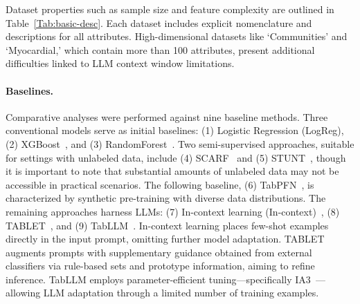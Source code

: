 Dataset properties such as sample size and feature complexity are outlined in Table~\ref{Tab:basic-desc}. Each dataset includes explicit nomenclature and descriptions for all attributes. High-dimensional datasets like `Communities' and `Myocardial,' which contain more than 100 attributes, present additional difficulties linked to LLM context window limitations.

\vspace*{-0.12in}
\paragraph{Baselines.}
Comparative analyses were performed against nine baseline methods. Three conventional models serve as initial baselines: (1) Logistic Regression (LogReg), (2) XGBoost~\cite{chen2016xgboost}, and (3) RandomForest~\cite{ho1995random}. Two semi-supervised approaches, suitable for settings with unlabeled data, include (4) SCARF~\cite{bahri2022scarf} and (5) STUNT~\cite{nam2023stunt}, though it is important to note that substantial amounts of unlabeled data may not be accessible in practical scenarios. The following baseline, (6) TabPFN~\cite{hollmann2022tabpfn}, is characterized by synthetic pre-training with diverse data distributions. The remaining approaches harness LLMs: (7) In-context learning (In-context)~\cite{wei2022emergent}, (8) TABLET~\cite{slack2023tablet}, and (9) TabLLM~\cite{hegselmann2023tabllm}. In-context learning places few-shot examples directly in the input prompt, omitting further model adaptation. TABLET augments prompts with supplementary guidance obtained from external classifiers via rule-based sets and prototype information, aiming to refine inference. TabLLM employs parameter-efficient tuning—specifically IA3~\cite{liu2022few}—allowing LLM adaptation through a limited number of training examples.

\vspace*{-0.12in}
